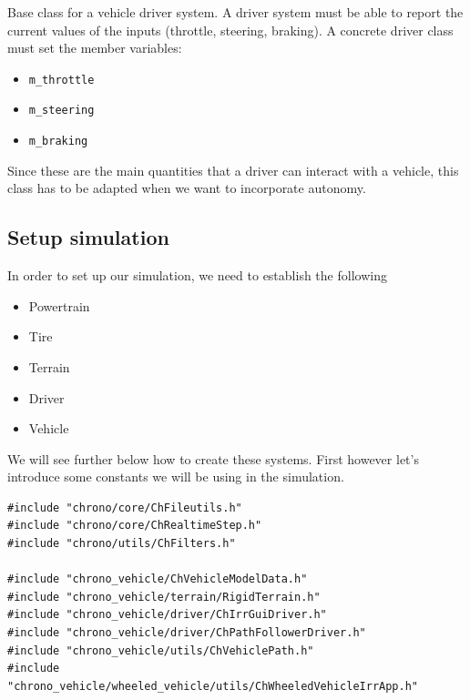Base class for a vehicle driver system.
A driver system must be able to report the current values of the inputs (throttle, steering, braking). 
A concrete driver class must set the member variables:

\begin{itemize}
\item \lstinline{m_throttle}
\item \lstinline{m_steering} 
\item \lstinline{m_braking}
\end{itemize}
Since these are the main quantities that a driver can interact with a vehicle, this class has to be adapted
when we want to incorporate autonomy. 


\subsection{Setup simulation}

In order to set up our simulation, we need to establish the following

\begin{itemize}
\item Powertrain
\item Tire
\item Terrain
\item Driver
\item Vehicle
\end{itemize}

We will see further below how to create these systems. First however let's introduce some constants we will be using in the simulation.


\begin{lstlisting}
#include "chrono/core/ChFileutils.h"
#include "chrono/core/ChRealtimeStep.h"
#include "chrono/utils/ChFilters.h"

#include "chrono_vehicle/ChVehicleModelData.h"
#include "chrono_vehicle/terrain/RigidTerrain.h"
#include "chrono_vehicle/driver/ChIrrGuiDriver.h"
#include "chrono_vehicle/driver/ChPathFollowerDriver.h"
#include "chrono_vehicle/utils/ChVehiclePath.h"
#include "chrono_vehicle/wheeled_vehicle/utils/ChWheeledVehicleIrrApp.h"
\end{lstlisting}


